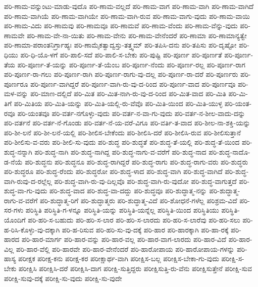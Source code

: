 {ಪರಿ-ಣಾಮ-ವನ್ನುಂಟು-ಮಾಡು-ವುದೊ
ಪರಿ-ಣಾಮ-ವಲ್ಲದೆ
ಪರಿ-ಣಾಮ-ವಾಗ
ಪರಿ-ಣಾಮ-ವಾಗಿ
ಪರಿ-ಣಾಮ-ವಾಗಿದೆ
ಪರಿ-ಣಾಮ-ವಾಗಿಯೆ
ಪರಿ-ಣಾಮ-ವಾಗಿಯೇ
ಪರಿ-ಣಾಮ-ವಾಗಿ-ರುವ
ಪರಿ-ಣಾಮ-ವಾಗು-ವುದು
ಪರಿ-ಣಾಮ-ವಾಯಿ
ಪರಿ-ಣಾಮ-ವಿದು
ಪರಿ-ಣಾಮವು
ಪರಿ-ಣಾಮವೂ
ಪರಿ-ಣಾಮವೆ
ಪರಿ-ಣಾಮ-ವೆಂದು
ಪರಿ-ಣಾಮ-ವೆನ್ನು-ವುದು
ಪರಿ-ಣಾಮವೇ
ಪರಿ-ಣಾಮ-ವೇ-ನಾ-ಯಿತು
ಪರಿ-ಣಾಮ-ವೇನು
ಪರಿ-ಣಾಮ-ವೇನೆಂದರೆ
ಪರಿ-ಣಾಮಾ
ಪರಿ-ಣಾಮಾನ್ಯತ್ವೇ
ಪರಿ-ಣಾಮಾ-ಪರಾಂತನಿರ್ಗ್ರಾಹ್ಯಃ
ಪರಿ-ಣಾಮೈಕತ್ವಾದ್ವಸ್ತು-ತತ್ತ್ವಮ್
ಪರಿ-ತಪಿಸಿ-ದನು
ಪರಿ-ತಪಿಸು
ಪರಿ-ದೃಷ್ಟೋ
ಪರಿ-ಧಿಯು
ಪರಿ-ಧಿ-ಯೊ-ಳಗೆ
ಪರಿ-ಪಾಲಿ-ಸದೆ
ಪರಿ-ಪಾಲಿ-ಸ-ಬೇಕು
ಪರಿ-ಪುಷ್ಟಿ
ಪರಿ-ಪೂರ್ಣ
ಪರಿ-ಪೂರ್ಣತೆ
ಪರಿ-ಪೂರ್ಣ-ತೆಯ
ಪರಿ-ಪೂರ್ಣ-ತೆ-ಯನ್ನು
ಪರಿ-ಪೂರ್ಣ-ತೆ-ಯೆಂಬ
ಪರಿ-ಪೂರ್ಣ-ನೆಂದು
ಪರಿ-ಪೂರ್ಣ-ರಲ್ಲ
ಪರಿ-ಪೂರ್ಣ-ರಾಗ
ಪರಿ-ಪೂರ್ಣ-ರಾ-ಗಲು
ಪರಿ-ಪೂರ್ಣ-ರಾಗಿ
ಪರಿ-ಪೂರ್ಣ-ರಾಗು-ವು-ದಲ್ಲ
ಪರಿ-ಪೂರ್ಣ-ರಾ-ದರೆ
ಪರಿ-ಪೂರ್ಣರು
ಪರಿ-ಪೂರ್ಣರೂ
ಪರಿ-ಪೂರ್ಣ-ವಾಗಿದ್ದರೆ
ಪರಿ-ಪೂರ್ಣ-ವಾಗಿ-ರು-ವು-ದ-ರಿಂದ
ಪರಿ-ಪೂರ್ಣ-ವಾದ
ಪರಿ-ಪೂರ್ಣವೂ
ಪರಿ-ಮಳ-ವನ್ನು
ಪರಿ-ಮಾಣ-ದಲ್ಲಿದೆ
ಪರಿ-ಮಿತ
ಪರಿ-ಮಿತ-ನಾಗಿ-ರು-ವು-ದ-ರಿಂದ
ಪರಿ-ಮಿತ-ವಾದ
ಪರಿ-ಮಿತಿ
ಪರಿ-ಮಿ-ತಿಗೆ
ಪರಿ-ಮಿತಿಯ
ಪರಿ-ಮಿತಿ-ಯನ್ನು
ಪರಿ-ಮಿತಿ-ಯಲ್ಲಿ-ರು-ವೆವೊ
ಪರಿ-ಮಿತಿ-ಯಿಂದ
ಪರಿ-ಮಿತಿ-ಯುಳ್ಳ
ಪರಿ-ಯಂತ-ರವೂ
ಪರಿ-ಯಂತವೂ
ಪರಿ-ವರ್ತ-ನಗೊಳ್ಳು-ವುದು
ಪರಿ-ವರ್ತ-ನ-ವಾ-ಗು-ವುದು
ಪರಿ-ವರ್ತ-ನ-ಶೀಲ-ವಾದು-ದನ್ನು
ಪರಿ-ವರ್ತನೆ
ಪರಿ-ವರ್ತ-ನೆ-ಗೊಂಡು
ಪರಿ-ವರ್ತ-ನೆ-ಯ-ವರೆ-ವಿಗೂ
ಪರಿ-ವರ್ತಿ-ತ-ವಾದ
ಪರಿ-ಶೀಲ-ನಾ-ಶಕ್ತಿ-ಯನ್ನು
ಪರಿ-ಶೀ-ಲನೆ
ಪರಿ-ಶೀ-ಲನೆ-ಯಲ್ಲಿ
ಪರಿ-ಶೀಲಿಸ-ಬೇಕೆಂದು
ಪರಿ-ಶೀಲಿಸಿ-ದರೆ
ಪರಿ-ಶೀಲಿಸಿ-ರುವ
ಪರಿ-ಶೀಲಿಸುತ್ತಾನೆ
ಪರಿ-ಶೀಲಿಸು-ವ-ವರು
ಪರಿ-ಶೀಲಿ-ಸು-ವುದು
ಪರಿ-ಶುದ್ಧ
ಪರಿ-ಶುದ್ಧತೆ
ಪರಿ-ಶುದ್ಧ-ತೆ-ಯಲ್ಲಿ
ಪರಿ-ಶುದ್ಧ-ತೆ-ಯಿಂದ
ಪರಿ-ಶುದ್ಧ-ನನ್ನಾಗಿ
ಪರಿ-ಶುದ್ಧ-ನಾಗಿ
ಪರಿ-ಶುದ್ಧ-ನಾಗಿದ್ದ
ಪರಿ-ಶುದ್ಧ-ನಾಗು-ವ-ವರೆಗೆ
ಪರಿ-ಶುದ್ಧ-ನಾದ
ಪರಿ-ಶುದ್ಧ-ನಾದೊ-ಡ-ನೆಯೆ
ಪರಿ-ಶುದ್ಧನು
ಪರಿ-ಶುದ್ಧನೂ
ಪರಿ-ಶುದ್ಧ-ರಾಗಿದ್ದರೆ
ಪರಿ-ಶುದ್ಧ-ರಾಗು
ಪರಿ-ಶುದ್ಧ-ರಾಗು-ವರು
ಪರಿ-ಶುದ್ಧರು
ಪರಿ-ಶುದ್ಧರೂ
ಪರಿ-ಶುದ್ಧ-ರೆಂದು
ಪರಿ-ಶುದ್ಧರೋ
ಪರಿ-ಶುದ್ಧ-ಳಾದ
ಪರಿ-ಶುದ್ಧ-ವಾಗಿ
ಪರಿ-ಶುದ್ಧ-ವಾಗಿದೆ
ಪರಿ-ಶುದ್ಧ-ವಾಗಿ-ರುವು-ದ-ರಲ್ಲೆಲ್ಲ
ಪರಿ-ಶುದ್ಧ-ವಾಗಿ-ರು-ವು-ದಿಲ್ಲವೊ
ಪರಿ-ಶುದ್ಧ-ವಾಗಿ-ರು-ವುದೋ
ಪರಿ-ಶುದ್ಧ-ವಾಗುತ್ತದೆ
ಪರಿ-ಶುದ್ಧ-ವಾ-ಗು-ವುದು
ಪರಿ-ಶುದ್ಧ-ವಾದ
ಪರಿ-ಶುದ್ಧ-ವಾ-ದದ್ದು
ಪರಿ-ಶುದ್ಧವೂ
ಪರಿ-ಶುದ್ಧಾತ್ಮ-ನನ್ನು
ಪರಿ-ಶುದ್ಧಾತ್ಮ-ರಾಗು-ವ-ವರೆಗೆ
ಪರಿ-ಶುದ್ಧಾತ್ಮ-ರಿಗೆ
ಪರಿ-ಶುದ್ಧಾತ್ಮರು
ಪರಿ-ಶುದ್ಧಾತ್ಮ-ವಿದೆ
ಪರಿ-ಶೋಧನೆ-ಗಳೆಲ್ಲ
ಪರಿಶ್ರಮ-ವಿದೆ
ಪರಿ-ಸರ-ಗಳು
ಪರಿಸ್ಥಿತಿ
ಪರಿಸ್ಥಿತಿ-ಗ-ಳನ್ನೂ
ಪರಿಸ್ಥಿತಿ-ಯನ್ನು
ಪರಿಸ್ಥಿತಿ-ಯನ್ನೆಲ್ಲ
ಪರಿಸ್ಥಿತಿ-ಯಿಂದ
ಪರಿಸ್ಥಿತಿಯು
ಪರಿಸ್ಥಿತಿ-ಯೊಂದಿಗೆ
ಪರಿ-ಹರಿ-ಸ-ಬಹುದು
ಪರಿ-ಹರಿ-ಸ-ಲಾರ
ಪರಿ-ಹರಿ-ಸ-ಲಾರದು
ಪರಿ-ಹರಿ-ಸ-ಲಾರೆವು
ಪರಿ-ಹರಿ-ಸಲು
ಪರಿ-ಹ-ರಿಸಿ-ಕೊಳ್ಳು-ವು-ದಕ್ಕಾಗಿ
ಪರಿ-ಹ-ರಿಸುವ
ಪರಿ-ಹರಿ-ಸು-ವು-ದಕ್ಕೆ
ಪರಿ-ಹಾರ
ಪರಿ-ಹಾರಕ್ಕಾಗಿ
ಪರಿ-ಹಾ-ರಕ್ಕೆ
ಪರಿ-ಹಾರದ
ಪರಿ-ಹಾರ-ಮಾರ್ಗ
ಪರಿ-ಹಾರ-ವನ್ನು
ಪರಿ-ಹಾರ-ವಲ್ಲ
ಪರಿ-ಹಾರ-ವಾಗ-ಲಾರದು
ಪರಿ-ಹಾರ-ವಿದೆ
ಪರಿ-ಹಾರ-ವಿಲ್ಲ
ಪರಿ-ಹಾರ-ವೆಲ್ಲಿ
ಪರಿ-ಹಾರವೇ
ಪರಿ-ಹಾರ-ವೇನೆಂದರೆ
ಪರಿ-ಹಾರೋಪಾಯ
ಪರಿ-ಹಾರೋಪಾಯ-ಗಳನ್ನು
ಪರಿ-ಹಾಸ್ಯ
ಪರೀಕ್ಷಕ
ಪರೀಕ್ಷ-ಕನು
ಪರೀಕ್ಷ-ಕರ
ಪರೀಕ್ಷಾರ್ಥ-ವಾಗಿ
ಪರೀಕ್ಷಿಸ-ಬಲ್ಲ
ಪರೀಕ್ಷಿಸ-ಬೇಕಾ-ಗು-ವುದು
ಪರೀಕ್ಷಿ-ಸ-ಬೇಕು
ಪರೀಕ್ಷಿಸಿ
ಪರೀಕ್ಷಿಸಿ-ದರೆ
ಪರೀಕ್ಷಿಸಿ-ದಾಗ
ಪರೀಕ್ಷಿ-ಸುತ್ತಿದ್ದರು
ಪರೀಕ್ಷಿಸುತ್ತಿ-ರು-ವೆನು
ಪರೀಕ್ಷಿಸುತ್ತೇನೆ
ಪರೀಕ್ಷಿ-ಸುವ
ಪರೀಕ್ಷಿ-ಸುವು-ದಕ್ಕೆ
ಪರೀಕ್ಷಿ-ಸು-ವುದು
ಪರೀಕ್ಷಿ-ಸು-ವುದೇ
}
